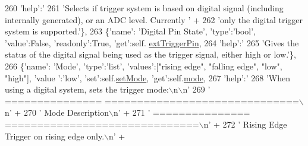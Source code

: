 \begin{DoxyCode}
{260                      \textcolor{stringliteral}{'help'}:\textcolor{stringliteral}{'%
261                             \textcolor{stringliteral}{'Selects if trigger system is based on digital signal (including internally
       generated), or an ADC level. Currently '} +
262                             \textcolor{stringliteral}{'only the digital trigger system is supported.'}\},
263             \{\textcolor{stringliteral}{'name'}: \textcolor{stringliteral}{'Digital Pin State'}, \textcolor{stringliteral}{'type'}:\textcolor{stringliteral}{'bool'}, \textcolor{stringliteral}{'value'}:\textcolor{keyword}{False}, \textcolor{stringliteral}{'readonly'}:\textcolor{keyword}{True}, \textcolor{stringliteral}{'get'}:self.
      \hyperlink{classsoftware_1_1chipwhisperer_1_1capture_1_1scopes_1_1__OpenADCInterface_1_1TriggerSettings_a1f8320b31303d45eb4c7f43268833893}{extTriggerPin},
264                      \textcolor{stringliteral}{'help'}:\textcolor{stringliteral}{'%
265                             \textcolor{stringliteral}{'Gives the status of the digital signal being used as the trigger signal,
       either high or low.'}\},
266             \{\textcolor{stringliteral}{'name'}: \textcolor{stringliteral}{'Mode'}, \textcolor{stringliteral}{'type'}:\textcolor{stringliteral}{'list'}, \textcolor{stringliteral}{'values'}:[\textcolor{stringliteral}{"rising edge"}, \textcolor{stringliteral}{"falling edge"}, \textcolor{stringliteral}{"low"}, \textcolor{stringliteral}{"high"}], \textcolor{stringliteral}{'value
      '}:\textcolor{stringliteral}{'low'}, \textcolor{stringliteral}{'set'}:self.\hyperlink{classsoftware_1_1chipwhisperer_1_1capture_1_1scopes_1_1__OpenADCInterface_1_1TriggerSettings_ae3ab455a8b6aa316214506a1bbb5ffb9}{setMode}, \textcolor{stringliteral}{'get'}:self.\hyperlink{classsoftware_1_1chipwhisperer_1_1capture_1_1scopes_1_1__OpenADCInterface_1_1TriggerSettings_a833d47731f239a5bf76c483a15773a68}{mode},
267                      \textcolor{stringliteral}{'help'}:\textcolor{stringliteral}{'%
268                             \textcolor{stringliteral}{'When using a digital system, sets the trigger mode:\(\backslash\)n\(\backslash\)n'}
269                             \textcolor{stringliteral}{'  =============== ==============================\(\backslash\)n'} +
270                             \textcolor{stringliteral}{'  Mode            Description\(\backslash\)n'} +
271                             \textcolor{stringliteral}{'  =============== ==============================\(\backslash\)n'} +
272                             \textcolor{stringliteral}{'  Rising Edge     Trigger on rising edge only.\(\backslash\)n'} +
}}}}
\end{DoxyCode}
